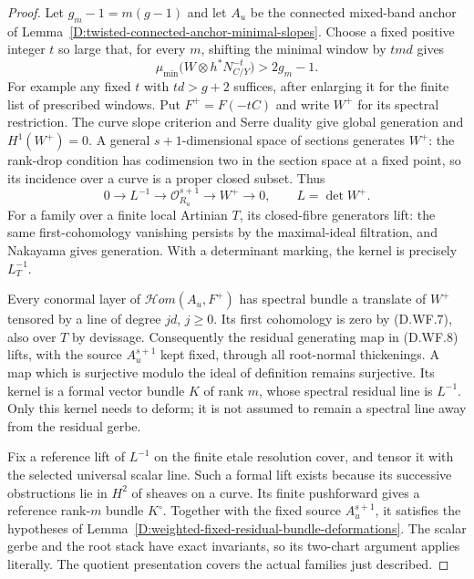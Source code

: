 \begin{proof}
Let $g_m-1=m(g-1)$ and let $A_u$ be the connected mixed-band
anchor of Lemma~\ref{D:twisted-connected-anchor-minimal-slopes}.
Choose a fixed positive integer $t$ so large that, for every
$m$, shifting the minimal window by $tmd$ gives
\[
 \mu_{\min}\bigl(W\otimes h^*N_{C/Y}^{-t}\bigr)
                          >2g_m-1.                     \tag{D.WF.7}
\]
For example any fixed $t$ with $td>g+2$ suffices, after
enlarging it for the finite list of prescribed windows.
Put $F^+=F(-tC)$ and write $W^+$ for its spectral restriction.
The curve slope criterion and Serre duality give global
generation and $H^1(W^+)=0$. A general $s+1$-dimensional
space of sections generates $W^+$: the rank-drop condition
has codimension two in the section space at a fixed point,
so its incidence over a curve is a proper closed subset.
Thus
\[
       0\longrightarrow L^{-1}
          \longrightarrow\mathcal O_{R_u}^{s+1}
          \longrightarrow W^+\longrightarrow0,
          \qquad L=\det W^+.                           \tag{D.WF.8}
\]
For a family over a finite local Artinian $T$, its closed-fibre
generators lift: the same first-cohomology vanishing persists
by the maximal-ideal filtration, and Nakayama gives generation.
With a determinant marking, the kernel is precisely $L_T^{-1}$.

Every conormal layer of $\mathcal Hom(A_u,F^+)$ has spectral
bundle a translate of $W^+$ tensored by a line of degree $jd$,
$j\geq0$. Its first cohomology is zero by (D.WF.7), also over
$T$ by devissage. Consequently the residual generating map
in (D.WF.8) lifts, with the source $A_u^{s+1}$ kept fixed,
through all root-normal thickenings. A map which is surjective
modulo the ideal of definition remains surjective. Its
kernel is a formal vector bundle $K$ of rank $m$, whose
spectral residual line is $L^{-1}$. Only this kernel needs
to deform; it is not assumed to remain a spectral line
away from the residual gerbe.

Fix a reference lift of $L^{-1}$ on the finite etale resolution
cover, and tensor it with the selected universal scalar line.
Such a formal lift exists because its successive obstructions
lie in $H^2$ of sheaves on a curve. Its finite pushforward
gives a reference rank-$m$ bundle $K^\circ$. Together with
the fixed source $A_u^{s+1}$, it satisfies the hypotheses of
Lemma~\ref{D:weighted-fixed-residual-bundle-deformations}.
The scalar gerbe and the root stack have exact invariants,
so its two-chart argument applies literally. The quotient
presentation covers the actual families just described.


\end{proof}
